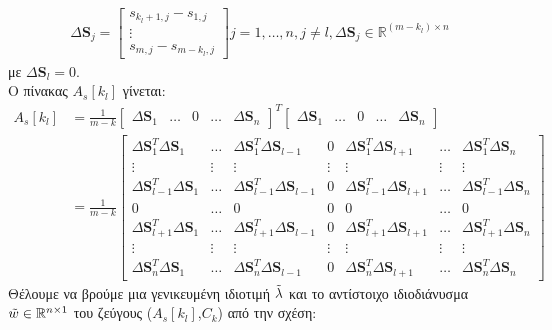 \begin{align*}
\Delta \mathbf{S}_j = \begin{bmatrix}
s_{k_l+1,j} - s_{1,j} \\
\vdots \\
s_{m,j}-s_{m-k_l,j}
\end{bmatrix}
 j=1,\ldots,n , j \neq l , \Delta\mathbf{S}_j \in \mathbb{R}^{(m-k_l)\times n}
\end{align*}
με $\Delta \mathbf{S}_l = 0$. \\
Ο πίνακας $A_s[k_l]$ γίνεται:
\begin{align*}
A_s[k_l] &= \frac{1}{m-k} 
\begin{bmatrix}
\Delta \mathbf{S}_1 & \ldots & 0 &\ldots & \Delta \mathbf{S}_n
\end{bmatrix}^T 
\begin{bmatrix}
\Delta \mathbf{S}_1 & \ldots & 0 &\ldots & \Delta \mathbf{S}_n
\end{bmatrix} \\
&= \frac{1}{m-k}
\begin{bmatrix}
\Delta \mathbf{S}_1^T \Delta \mathbf{S}_1 & \ldots & \Delta \mathbf{S}_1^T \Delta\mathbf{S}_{l-1} & 0 & \Delta \mathbf{S}_1^T \Delta\mathbf{S}_{l+1} & \ldots & \Delta \mathbf{S}_1^T \Delta\mathbf{S}_{n} \\
\vdots & \vdots & \vdots & \vdots & \vdots & \vdots & \vdots \\
\Delta \mathbf{S}_{l-1}^T \Delta \mathbf{S}_1 & \ldots & \Delta \mathbf{S}_{l-1}^T \Delta\mathbf{S}_{l-1} & 0 & \Delta \mathbf{S}_{l-1}^T \Delta\mathbf{S}_{l+1} & \ldots & \Delta \mathbf{S}_{l-1}^T \Delta\mathbf{S}_{n} \\
0 & \ldots & 0 & 0 & 0 & \ldots & 0 \\
\Delta \mathbf{S}_{l+1}^T \Delta \mathbf{S}_1 & \ldots & \Delta \mathbf{S}_{l+1}^T \Delta\mathbf{S}_{l-1} & 0 & \Delta \mathbf{S}_{l+1}^T \Delta\mathbf{S}_{l+1} & \ldots & \Delta \mathbf{S}_{l+1}^T \Delta\mathbf{S}_{n} \\
\vdots & \vdots & \vdots & \vdots & \vdots & \vdots & \vdots \\
\Delta \mathbf{S}_{n}^T \Delta \mathbf{S}_1 & \ldots & \Delta \mathbf{S}_{n}^T \Delta\mathbf{S}_{l-1} & 0 & \Delta \mathbf{S}_{n}^T \Delta\mathbf{S}_{l+1} & \ldots & \Delta \mathbf{S}_{n}^T \Delta\mathbf{S}_{n}
\end{bmatrix}
\end{align*}
Θέλουμε να βρούμε μια γενικευμένη ιδιοτιμή $\Tilde{\lambda}$ και το αντίστοιχο ιδιοδιάνυσμα $\Tilde{w} \in \mathbb{R}^{n \times 1}$ του ζεύγους ($A_s[k_l]$,$C_k$) από την σχέση:
